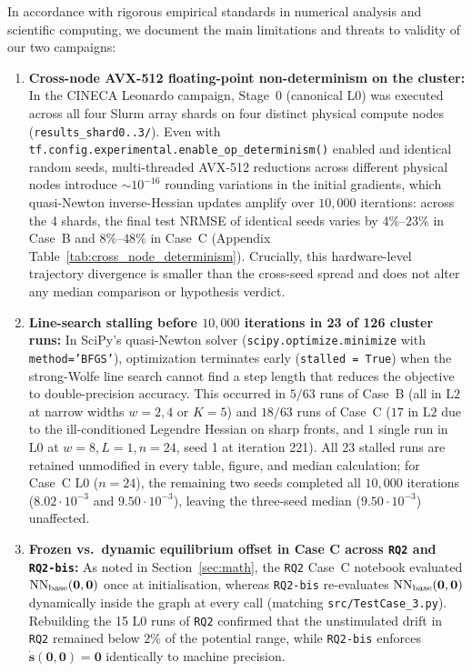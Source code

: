 In accordance with rigorous empirical standards in numerical analysis and scientific computing, we document the main limitations and threats to validity of our two campaigns:
\begin{enumerate}[leftmargin=2em]
  \item \textbf{Cross-node AVX-512 floating-point non-determinism on the cluster:} In the CINECA Leonardo campaign, Stage~0 (canonical $\mathrm{L0}$) was executed across all four Slurm array shards on four distinct physical compute nodes (\texttt{results\_shard0..3/}). Even with \texttt{tf.config.experimental.enable\_op\_determinism()} enabled and identical random seeds, multi-threaded AVX-512 reductions across different physical nodes introduce $\sim 10^{-16}$ rounding variations in the initial gradients, which quasi-Newton inverse-Hessian updates amplify over $10{,}000$ iterations: across the 4 shards, the final test NRMSE of identical seeds varies by $4\%$--$23\%$ in Case~B and $8\%$--$48\%$ in Case~C (Appendix Table~\ref{tab:cross_node_determinism}). Crucially, this hardware-level trajectory divergence is smaller than the cross-seed spread and does not alter any median comparison or hypothesis verdict.
  \item \textbf{Line-search stalling before $10{,}000$ iterations in 23 of 126 cluster runs:} In SciPy's quasi-Newton solver (\texttt{scipy.optimize.minimize} with \texttt{method='BFGS'}), optimization terminates early (\texttt{stalled = True}) when the strong-Wolfe line search cannot find a step length that reduces the objective to double-precision accuracy. This occurred in $5/63$ runs of Case~B (all in $\mathrm{L2}$ at narrow widths $w=2,4$ or $K=5$) and $18/63$ runs of Case~C ($17$ in $\mathrm{L2}$ due to the ill-conditioned Legendre Hessian on sharp fronts, and $1$ single run in $\mathrm{L0}$ at $w=8, L=1, n=24$, seed 1 at iteration 221). All 23 stalled runs are retained unmodified in every table, figure, and median calculation; for Case~C $\mathrm{L0}$ ($n=24$), the remaining two seeds completed all $10{,}000$ iterations ($8.02\cdot 10^{-3}$ and $9.50\cdot 10^{-3}$), leaving the three-seed median ($9.50\cdot 10^{-3}$) unaffected.
  \item \textbf{Frozen vs.\ dynamic equilibrium offset in Case C across \texttt{RQ2} and \texttt{RQ2-bis}:} As noted in Section~\ref{sec:math}, the \texttt{RQ2} Case~C notebook evaluated $\mathrm{NN}_{\mathrm{base}}(\mathbf{0},\mathbf{0})$ once at initialisation, whereas \texttt{RQ2-bis} re-evaluates $\mathrm{NN}_{\mathrm{base}}(\mathbf{0},\mathbf{0})$ dynamically inside the graph at every call (matching \texttt{src/TestCase\_3.py}). Rebuilding the 15 $\mathrm{L0}$ runs of \texttt{RQ2} confirmed that the unstimulated drift in \texttt{RQ2} remained below $2\%$ of the potential range, while \texttt{RQ2-bis} enforces $\dot{\mathbf{s}}(\mathbf{0},\mathbf{0}) = \mathbf{0}$ identically to machine precision.

\end{enumerate}
